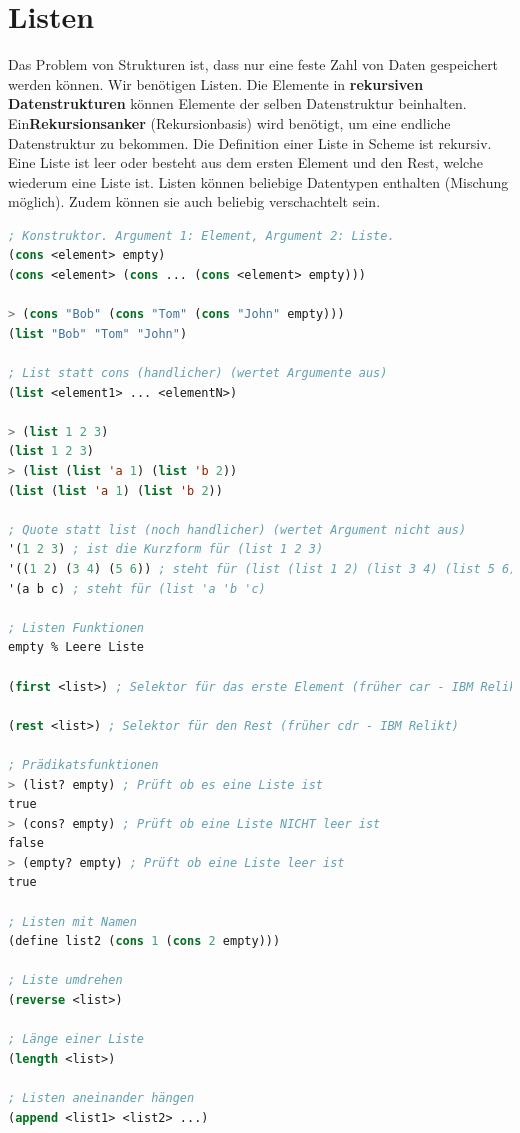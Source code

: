 \section{Listen}
Das Problem von Strukturen ist, dass nur eine feste Zahl von Daten gespeichert werden können. Wir benötigen Listen. Die Elemente in \textbf{rekursiven Datenstrukturen} können Elemente der selben Datenstruktur beinhalten. Ein\textbf{Rekursionsanker} (Rekursionbasis) wird benötigt, um eine endliche Datenstruktur zu bekommen.
Die Definition einer Liste in Scheme ist rekursiv. Eine Liste ist leer oder besteht aus dem ersten Element und den Rest, welche wiederum eine Liste ist. Listen können beliebige Datentypen enthalten (Mischung möglich). Zudem können sie auch beliebig verschachtelt sein.

\begin{lstlisting}[language=Lisp, caption=Listen]
; Konstruktor. Argument 1: Element, Argument 2: Liste.
(cons <element> empty)
(cons <element> (cons ... (cons <element> empty)))

> (cons "Bob" (cons "Tom" (cons "John" empty)))
(list "Bob" "Tom" "John")

; List statt cons (handlicher) (wertet Argumente aus)
(list <element1> ... <elementN>)

> (list 1 2 3)
(list 1 2 3)
> (list (list 'a 1) (list 'b 2))
(list (list 'a 1) (list 'b 2))

; Quote statt list (noch handlicher) (wertet Argument nicht aus)
'(1 2 3) ; ist die Kurzform für (list 1 2 3)
'((1 2) (3 4) (5 6)) ; steht für (list (list 1 2) (list 3 4) (list 5 6))
'(a b c) ; steht für (list 'a 'b 'c)

; Listen Funktionen
empty % Leere Liste

(first <list>) ; Selektor für das erste Element (früher car - IBM Relikt)

(rest <list>) ; Selektor für den Rest (früher cdr - IBM Relikt)

; Prädikatsfunktionen
> (list? empty) ; Prüft ob es eine Liste ist
true
> (cons? empty) ; Prüft ob eine Liste NICHT leer ist
false
> (empty? empty) ; Prüft ob eine Liste leer ist
true

; Listen mit Namen
(define list2 (cons 1 (cons 2 empty)))

; Liste umdrehen
(reverse <list>)

; Länge einer Liste
(length <list>)

; Listen aneinander hängen
(append <list1> <list2> ...)
\end{lstlisting}

